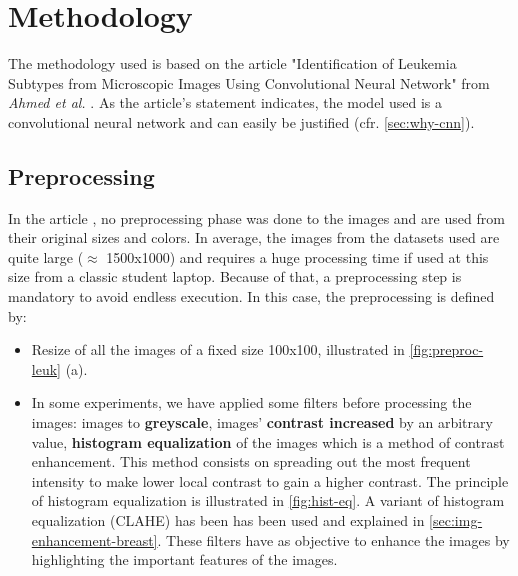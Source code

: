 \documentclass[11pt, openany]{report}
\theoremstyle{plain}
\theoremstyle{definition}
\theoremstyle{remark}
\begin{document}
\section{Methodology}

The methodology used is based on the article "Identification of Leukemia Subtypes from
Microscopic Images Using Convolutional Neural Network" from \textit{Ahmed et al.} \citep{leukemia}. As the article's statement indicates, the model used is a convolutional neural network and can easily be justified (cfr. \autoref{sec:why-cnn}). 


\subsection{Preprocessing}
In the article \cite{leukemia}, no preprocessing phase was done to the images and are used from their original sizes and colors. In average, the images from the datasets used are quite large ($\approx$ 1500x1000) and requires a huge processing time if used at this size from a classic student laptop. Because of that, a preprocessing step is mandatory to avoid endless execution. In this case, the preprocessing is defined by: 
\begin{itemize}
\item Resize of all the images of a fixed size 100x100, illustrated in \autoref{fig:preproc-leuk} (a). 
\item In some experiments, we have applied some filters before processing the images: images to \textbf{greyscale}, images' \textbf{contrast increased} by an arbitrary value, \textbf{histogram equalization} of the images which is a method of contrast enhancement. This method consists on spreading out the most frequent intensity to make lower local contrast to gain a higher contrast. The principle of histogram equalization is illustrated in \autoref{fig:hist-eq}. A variant of histogram equalization (CLAHE) has been has been used and explained in \autoref{sec:img-enhancement-breast}. These filters have as objective to enhance the images by highlighting the important features of the images.  
\end{itemize}
\end{document}
